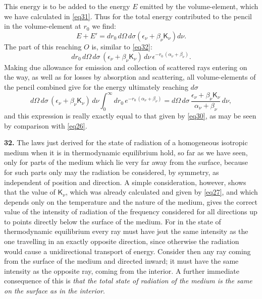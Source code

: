 \documentclass[12pt,oneside]{book}
\begin{document}
This energy is to be added to the energy $E$ emitted by the volume-element, which we have calculated in \eqref{eq31}. Thus for the total energy contributed to the pencil in the volume-element at $r_0$ we find:
$$E+E'=dr_0\, d\Omega\, d\sigma(\epsilon_\nu+\beta_\nu\mathsf{K}_\nu)d\nu.$$
The part of this reaching $O$ is, similar to \eqref{eq32}:
$$dr_0\, d\Omega\, d\sigma\, (\epsilon_\nu+\beta_\nu\mathsf{K}_\nu)\, d\nu\, \epsilon^{-r_0\, (\alpha_\nu+\beta_\nu)}.$$
Making due allowance for emission and collection of scattered rays entering on the way, as well as for losses by absorption and scattering, all volume-elements of the pencil combined give for the energy ultimately reaching $d\sigma$
$$d\Omega\, d\sigma\, (\epsilon_\nu+\beta_\nu\mathsf{K}_\nu)\, d\nu\int_0^\infty dr_0\, e^{-r_0\, (\alpha_\nu+\beta_\nu)}=d\Omega\, d\sigma\, \frac{\epsilon_\nu+\beta_\nu\mathsf{K}_\nu}{\alpha_\nu+\beta_\nu}\, d\nu,$$
and this expression is really exactly equal to that given by \eqref{eq30}, as may be seen by comparison with \eqref{eq26}. \par

\textbf{32.} The laws just derived for the state of radiation of a homogeneous isotropic medium when it is in thermodynamic equilibrium hold, so far as we have seen, only for parts of the medium which lie very far away from the surface, because for such parts only may the radiation be considered, by symmetry, as independent of position and direction. A simple consideration, however, shows that the value of $\mathsf{K}_\nu$, which was already calculated and given by \eqref{eq27}, and which depends only on the temperature and the nature of the medium, gives the correct value of the intensity of radiation of the frequency considered for all directions up to points directly below the surface of the medium. For in the state of thermodynamic equilibrium every ray must have jsut the same intensity as the one travelling in an exactly opposite direction, since otherwise the radiation would cause a unidirectional transport of energy. Consider then any ray coming from the surface of the medium and directed inward; it must have the same intensity as the opposite ray, coming from the interior. A further immediate consequence of this is \textit{that the total state of radiation of the medium is the same on the surface as in the interior}. \par
\end{document}
